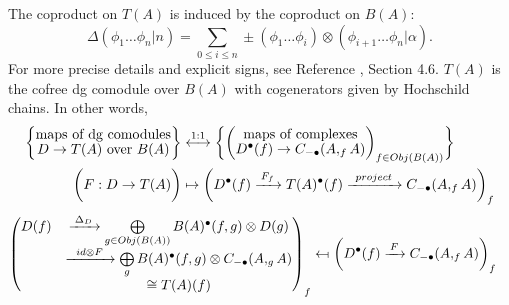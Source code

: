 %
The coproduct on $T(A)$ is induced by the 
coproduct on $B(A)$:
$$\Delta(\phi_1\dots \phi_n|n) = 
\sum \limits_{0 \leq i \leq n}
\pm (\phi_1 \dots \phi_i) \otimes (\phi_{i+1}\dots \phi_n|\alpha).$$
%
For more precise details and explicit signs, 
see Reference \cite{T}, Section 4.6. 
$T(A)$ is the cofree dg comodule over $B(A)$ with 
cogenerators given by Hochschild chains. 
In other words, 
\begin{equation} \label{eq:cofree}
\begin{split}
\bigg\{ \let\scriptstyle\textstyle
\substack{\textrm{maps of dg comodules}\\
  D \to T(A) \textrm{ over }B(A)} 
\bigg\}
&\overset{1:1}{\longleftrightarrow}
\bigg\{ \bigg( \let\scriptstyle\textstyle
\substack{\textrm{maps of complexes}\\
  D^\bullet(f) \to C_{-\bullet}(A, _fA)}
\bigg)_{f \in Obj(B(A))} \bigg\}\\
%
\bigg( F:D\to T(A) \bigg)
&\mapsto
\bigg(
  D^\bullet(f) 
  \xrightarrow{F_f} T(A)^\bullet(f)
  \xrightarrow{project}
  C_{-\bullet}(A, _fA)
\bigg)_f
\end{split}
\end{equation}
\begin{align*}  
\begin{pmatrix}
  D(f)
  &\xrightarrow{\Delta_D}
  \bigoplus \limits_{g \in Obj(B(A))}
  B(A)^\bullet(f,g) \otimes D(g)\\
  &\xrightarrow{id \otimes F}
  \bigoplus \limits_g
  B(A)^\bullet(f,g) \otimes C_{-\bullet}(A, _gA)\\
  &\cong T(A)(f)
  \end{pmatrix} _f
&\leftmapsto  
\bigg( D^\bullet(f) \xrightarrow{F}
  C_{-\bullet}(A, _fA)
  \bigg)_f
\end{align*}